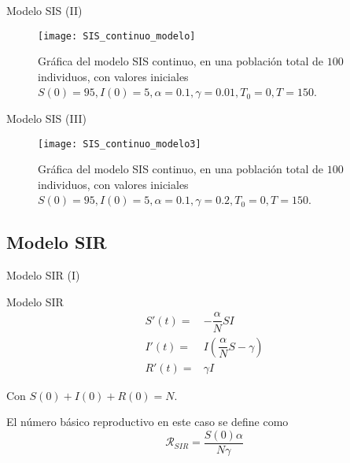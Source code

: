 \begin{frame}{Modelo SIS (II)}
    \begin{figure}
    \begin{center}
        \caption{Gráfica del modelo SIS continuo, en una población total de $100$ individuos, con valores iniciales $S(0)=95, I(0) = 5, \alpha = 0.1, \gamma = 0.01, T_0 = 0, T = 150$.}
        \label{fig: SIS_continuo}
        \texttt{[image: SIS\_continuo\_modelo]}
        \end{center}
        \end{figure}

    

\end{frame}

\begin{frame}{Modelo SIS (III)}
    \begin{figure}
        \begin{center}
        \caption{Gráfica del modelo SIS continuo, en una población total de $100$ individuos, con valores iniciales $S(0)=95, I(0) = 5, \alpha = 0.1, \gamma = 0.2, T_0 = 0, T = 150$.}
        \label{fig: SIS_continuo3}
        \texttt{[image: SIS\_continuo\_modelo3]}
        \end{center}
        \end{figure}

\end{frame}

\subsection{Modelo SIR}


\begin{frame}{Modelo SIR (I)}
    \begin{block}{Modelo SIR}
        \begin{equation}
            \label{eqn: modelo_SIR_continuo}
            \begin{aligned}
            S'(t) = & -\dfrac{\alpha}{N}SI \\
            I'(t) = & I\left(\dfrac{\alpha}{N}S-\gamma \right) \\
            R'(t) = & \gamma I
            \end{aligned}
            \end{equation}
            
            Con $S(0)+I(0)+R(0)=N$.
    \end{block}

    \pause
    El número básico reproductivo en este caso se define como
    $$\mathcal{R}_{SIR}=\frac{S(0)\alpha }{N\gamma }$$

\end{frame}


